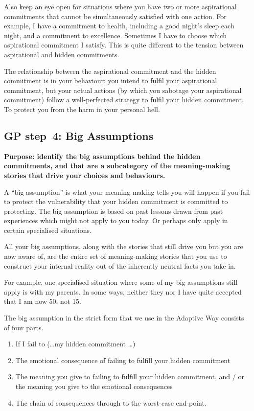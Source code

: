 Also keep an eye open for situations where you have two or more aspirational commitments that cannot be simultaneously satisfied with one action. For example, I have a commitment to health, including a good night's sleep each night, and a commitment to excellence. Sometimes I have to choose which aspirational commitment I satisfy. This is quite different to the tension between aspirational and hidden commitments.


The relationship between the aspirational commitment and the hidden commitment is in your behaviour: you intend to fulfil your aspirational commitment, but your actual actions (by which you sabotage your aspirational commitment) follow a well-perfected strategy to fulfil your hidden commitment. To protect you from the harm in your personal hell.


\subsection{GP step~4: Big Assumptions}
\label{chapter:big-assumptions}


\textbf{Purpose: identify the big assumptions behind the hidden commitments, and that are a subcategory of the meaning-making stories that drive your choices and behaviours.} ~


A “big assumption” is what your meaning\hyp{}making tells you will happen if you fail to protect the vulnerability that your hidden commitment is committed to protecting. The big assumption is based on past lessons drawn from past experiences which might not apply to you today. Or perhaps only apply in certain specialised situations.


All your big assumptions, along with the stories that still drive you but you are now aware of, are the entire set of meaning-making stories that you use to construct your internal reality out of the inherently neutral facts you take in.


For example, one specialised situation where some of my big assumptions still apply is with my parents. In some ways, neither they nor I have quite accepted that I am now 50, not 15. 


The big assumption in the strict form that we use in the Adaptive Way consists of four parts. 


\begin{enumerate}
\item If I fail to (\ldots my hidden commitment \ldots)
\item The emotional consequence of failing to fulfill your hidden commitment
\item The meaning you give to failing to fulfill your hidden commitment, and / or the meaning you give to the emotional consequences
\item The chain of consequences through to the worst-case end-point.
\end{enumerate}


